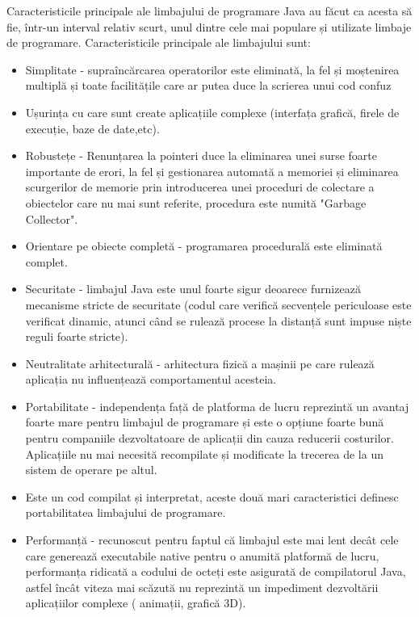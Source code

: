 \documentclass[12pt]{book}
\begin{document}
Caracteristicile principale ale limbajului de programare Java au făcut ca acesta să fie, într-un interval relativ scurt, unul dintre cele mai populare și utilizate limbaje de programare. Caracteristicile principale ale limbajului sunt:
\begin{addmargin}[4em]{1em}
	\begin{itemize}
		\item Simplitate - supraîncărcarea operatorilor este eliminată, la fel și moștenirea multiplă și toate facilitățile care ar putea duce la scrierea unui cod confuz
		\item Ușurința cu care sunt create aplicațiile complexe (interfața grafică, firele de execuție, baze de date,etc).
		\item Robustețe - Renunțarea la pointeri duce la eliminarea unei surse foarte importante de erori, la fel și gestionarea automată a memoriei și eliminarea scurgerilor de memorie prin introducerea unei proceduri de colectare a obiectelor care nu mai sunt referite, procedura este numită "Garbage Collector".
		\item	Orientare pe obiecte completă - programarea procedurală este eliminată complet.
		\item Securitate - limbajul Java este unul foarte sigur deoarece furnizează mecanisme stricte de securitate (codul care verifică secvențele periculoase este verificat dinamic, atunci când se rulează procese la distanță sunt impuse niște reguli foarte stricte).
		\item Neutralitate arhitecturală - arhitectura fizică a mașinii pe care rulează aplicația nu influențează comportamentul acesteia.
		\item Portabilitate - independența față de platforma de lucru reprezintă un avantaj foarte mare pentru limbajul de programare și este o opțiune foarte bună pentru companiile dezvoltatoare de aplicații din cauza reducerii costurilor. Aplicațiile nu mai necesită recompilate și modificate la trecerea de la un sistem de operare pe altul.
		\item	Este un cod compilat și interpretat, aceste două mari caracteristici definesc portabilitatea limbajului de programare.
		\item Performanță - recunoscut pentru faptul că limbajul este mai lent decât cele care generează executabile native pentru o anumită platformă de lucru, performanța ridicată a codului de octeți este asigurată de compilatorul Java, astfel încât viteza mai scăzută nu reprezintă un impediment dezvoltării aplicațiilor complexe ( animații, grafică 3D).
\end{itemize}
\end{addmargin}
\end{document}

